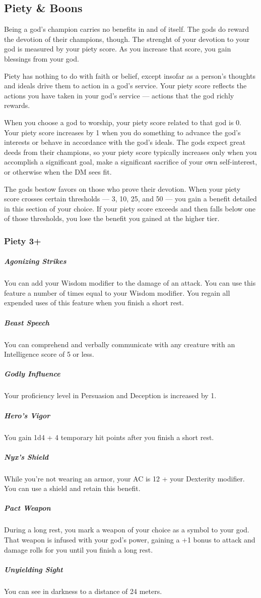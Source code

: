 \subsection*{Piety \& Boons} \label{ssec::pietyandboons}
Being a god's champion carries no benefits in and of itself.
The gods do reward the devotion of their champions, though.
The strenght of your devotion to your god is measured by your piety score.
As you increase that score, you gain blessings from your god.

Piety has nothing to do with faith or belief, except insofar as a person's thoughts and ideals drive them to action in a god's service.
Your piety score reflects the actions you have taken in your god's service --- actions that the god richly rewards.

When you choose a god to worship, your piety score related to that god is 0.
Your piety score increases by 1 when you do something to advance the god's interests or behave in accordance with the god's ideals.
The gods expect great deeds from their champions, so your piety score typically increases only when you accomplish a significant goal, make a significant sacrifice of your own self-interest, or otherwise when the DM sees fit.

The gods bestow favors on those who prove their devotion.
When your piety score crosses certain thresholds --- 3, 10, 25, and 50 --- you gain a benefit detailed in this section of your choice.
If your piety score exceeds and then falls below one of those thresholds, you lose the benefit you gained at the higher tier.

\subsubsection{Piety 3+}
    \subparagraph{Agonizing Strikes}
        You can add your Wisdom modifier to the damage of an attack.
        You can use this feature a number of times equal to your Wisdom modifier.
        You regain all expended uses of this feature when you finish a short rest.
    \subparagraph{Beast Speech}
        You can comprehend and verbally communicate with any creature with an Intelligence score of 5 or less.
    \subparagraph{Godly Influence}
        Your proficiency level in Persuasion and Deception is increased by 1.
    \subparagraph{Hero's Vigor}
        You gain 1d4 + 4 temporary hit points after you finish a short rest.
    \subparagraph{Nyx's Shield}
        While you're not wearing an armor, your AC is 12 + your Dexterity modifier.
        You can use a shield and retain this benefit.
    \subparagraph{Pact Weapon}
        During a long rest, you mark a weapon of your choice as a symbol to your god.
        That weapon is infused with your god's power, gaining a +1 bonus to attack and damage rolls for you until you finish a long rest.
    \subparagraph{Unyielding Sight}
        You can see in darkness to a distance of 24 meters.

